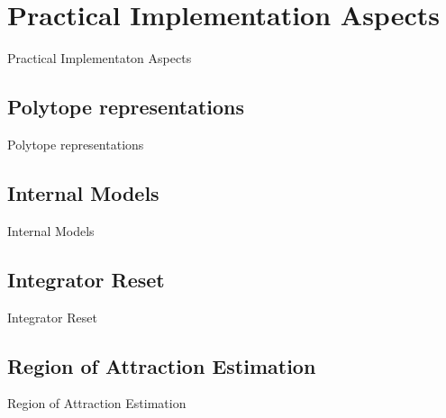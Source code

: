 
\chapter{Practical Implementation Aspects}%
\label{chp:practival-implementation-aspects}

Practical Implementaton Aspects

\section{Polytope representations}%
\label{sec:polytope-representation}

Polytope representations

\section{Internal Models}%
\label{sec:internal-models}

Internal Models

\section{Integrator Reset}%
\label{sec:integrator-reset}

Integrator Reset

\section{Region of Attraction Estimation}%
\label{sec:roa-estimation}

Region of Attraction Estimation
